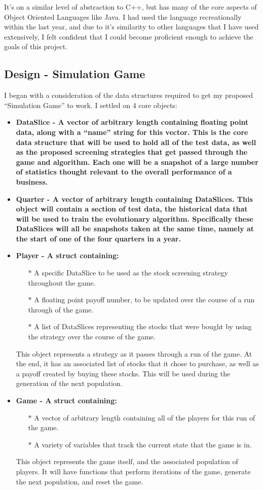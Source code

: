 It's on a similar level of abstraction to C++, but has many of the core aspects of Object Oriented Languages like Java. I had used the language recreationally within the last year, and due to it's similarity to other languages that I have used extensively, I felt confident that I could become proficient enough to achieve the goals of this project.

\subsection{Design - Simulation Game}
I began with a consideration of the data structures required to get my proposed ``Simulation Game'' to work. I settled on 4 core objects:
\begin{itemize}
    \item \bf DataSlice \rm - A vector of arbitrary length containing floating point data, along with a ``name'' string for this vector. This is the core data structure that will be used to hold all of the test data, as well as the proposed screening strategies that get passed through the game and algorithm. Each one will be a snapshot of a large number of statistics thought relevant to the overall performance of a business.
    \item \bf Quarter \rm - A vector of arbitrary length containing DataSlices. This object will contain a section of test data, the historical data that will be used to train the evolutionary algorithm. Specifically these DataSlices will all be snapshots taken at the same time, namely at the start of one of the four quarters in a year.
    \item \bf Player \rm - A struct containing:
    \begin{itemize}
        \item[$\ast$] A specific DataSlice to be used as the stock screening strategy throughout the game.
        \item[$\ast$] A floating point payoff number, to be updated over the course of a run through of the game.
        \item[$\ast$] A list of DataSlices representing the stocks that were bought by using the strategy over the course of the game.
    \end{itemize}
    This object represents a strategy as it passes through a run of the game. At the end, it has an associated list of stocks that it chose to purchase, as well as a payoff created by buying these stocks. This will be used during the generation of the next population.
    \item \bf Game \rm - A struct containing:
    \begin{itemize}
        \item[$\ast$] A vector of arbitrary length containing all of the players for this run of the game.
        \item[$\ast$] A variety of variables that track the current state that the game is in.
    \end{itemize}
        This object represents the game itself, and the associated population of players. It will have functions that perform iterations of the game, generate the next population, and reset the game.
\end{itemize}
